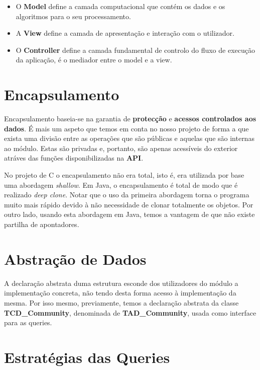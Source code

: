 \documentclass[a4paper]{article}
\begin{document}
\begin{itemize}
  \item O \textbf{Model} define a camada computacional que contém os dados e os 
    algoritmos para o seu processamento.

  \item A \textbf{View} define a camada de apresentação e interação com o utilizador.

  \item O \textbf{Controller} define a camada fundamental de controlo do fluxo de
    execução da aplicação, é o mediador entre o model e a view.
\end{itemize}

\section{Encapsulamento}
\label{sec:encapsulamento}

Encapsulamento baseia-se na garantia de \textbf{protecção} e 
\textbf{acessos controlados aos dados}. É mais um aspeto que temos em 
conta no nosso projeto de forma a que exista uma divisão entre as operações 
que são públicas e aquelas que são internas ao módulo. Estas são privadas e,
portanto, são apenas acessíveis do exterior atráves das funções
disponibilizadas na \textbf{API}.

No projeto de C o encapsulamento não era total, isto é, era utilizada por base
uma abordagem \textit{shallow}. Em Java, o encapsulamento é total de modo que é
realizado \textit{deep clone}. Notar que o uso da primeira abordagem torna o 
programa muito mais rápido devido à não necessidade de clonar totalmente os 
objetos. Por outro lado, usando esta abordagem em Java, temos a vantagem de que 
não existe partilha de apontadores.

\section{Abstração de Dados}
\label{sec:abstracao_de_dados}

A declaração abstrata duma estrutura esconde dos utilizadores do módulo a
implementação concreta, não tendo desta forma acesso à implementação
da mesma. Por isso mesmo, previamente, temos a declaração abstrata da 
classe \textbf{TCD\_Community}, denominada de \textbf{TAD\_Community}, usada
como interface para as queries.

\section{Estratégias das Queries}
\label{sec:estrategias}
\end{document}
